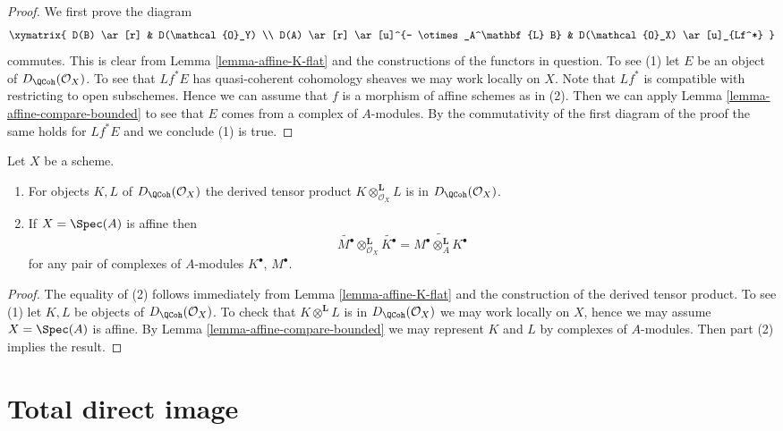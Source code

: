 \begin{proof}
We first prove the diagram
$$
\xymatrix{
D(B) \ar[r] & D(\mathcal{O}_Y) \\
D(A) \ar[r] \ar[u]^{- \otimes_A^\mathbf{L} B} &
D(\mathcal{O}_X) \ar[u]_{Lf^*}
}
$$
commutes. This is clear from Lemma \ref{lemma-affine-K-flat} and
the constructions of the functors in question. To see (1) let
$E$ be an object of $D_\QCoh(\mathcal{O}_X)$. To see that
$Lf^*E$ has quasi-coherent cohomology sheaves we may work locally on $X$.
Note that $Lf^*$ is compatible with restricting to open subschemes.
Hence we can assume that $f$ is a morphism of affine schemes as in (2).
Then we can apply Lemma \ref{lemma-affine-compare-bounded} to see that
$E$ comes from a complex of $A$-modules. By the commutativity of the first
diagram of the proof the same holds for $Lf^*E$ and we conclude (1) is true.
\end{proof}

\begin{lemma}
\label{lemma-quasi-coherence-tensor-product}
Let $X$ be a scheme.
\begin{enumerate}
\item For objects $K, L$ of $D_\QCoh(\mathcal{O}_X)$
the derived tensor product $K \otimes^\mathbf{L}_{\mathcal{O}_X} L$ is in
$D_\QCoh(\mathcal{O}_X)$.
\item If $X = \Spec(A)$ is affine then
$$
\widetilde{M^\bullet} \otimes_{\mathcal{O}_X}^\mathbf{L} \widetilde{K^\bullet}
=
\widetilde{M^\bullet \otimes_A^\mathbf{L} K^\bullet}
$$
for any pair of complexes of $A$-modules $K^\bullet$, $M^\bullet$.
\end{enumerate}
\end{lemma}

\begin{proof}
The equality of (2) follows immediately from Lemma \ref{lemma-affine-K-flat}
and the construction of the derived tensor product.
To see (1) let $K, L$ be objects of $D_\QCoh(\mathcal{O}_X)$.
To check that $K \otimes^\mathbf{L} L$ is in
$D_\QCoh(\mathcal{O}_X)$ we may work locally on $X$, hence
we may assume $X = \Spec(A)$ is affine. By
Lemma \ref{lemma-affine-compare-bounded} we may represent
$K$ and $L$ by complexes of $A$-modules. Then part (2) implies
the result.
\end{proof}





\section{Total direct image}
\label{section-total-direct-image}

